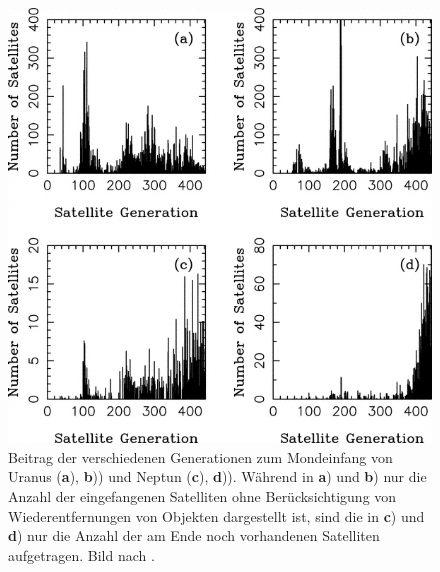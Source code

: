 \documentclass[12pt,a4paper,twoside]{article}
\renewcommand{\cite}{\citep}
\begin{document}
\begin{figure}[tbn]
\centering
\includegraphics[scale=0.4]{img/Nesvorny2007-8.png}
\caption{Beitrag der verschiedenen Generationen zum Mondeinfang von Uranus (\textbf{a}), \textbf{b})) und Neptun (\textbf{c}), \textbf{d})). Während in \textbf{a}) und \textbf{b}) nur die Anzahl der eingefangenen Satelliten ohne Berücksichtigung von Wiederentfernungen von Objekten dargestellt ist, sind die in  \textbf{c}) und \textbf{d}) nur die Anzahl der am Ende noch vorhandenen Satelliten aufgetragen. Bild nach \cite{Nesvorny2007}.} %
\label{fig:Mondgenerationen}
\end{figure}
\end{document}
